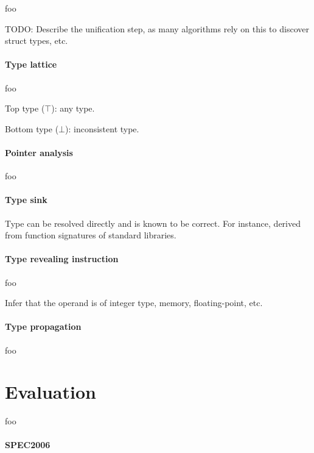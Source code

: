 \documentclass[10pt, a4paper, sigplan, authordraft]{acmart}
\begin{document}
foo

TODO: Describe the unification step, as many algorithms rely on this to discover struct types, etc.

\paragraph{Type lattice}

foo

Top type ($\top$): any type.

Bottom type ($\bot$): inconsistent type.

\paragraph{Pointer analysis}

foo

\paragraph{Type sink}


Type can be resolved directly and is known to be correct. For instance, derived from function signatures of standard libraries.

\paragraph{Type revealing instruction}

foo


Infer that the operand is of integer type, memory, floating-point, etc.


\paragraph{Type propagation}

foo


\section{Evaluation}

foo



\paragraph{SPEC2006}
\end{document}
